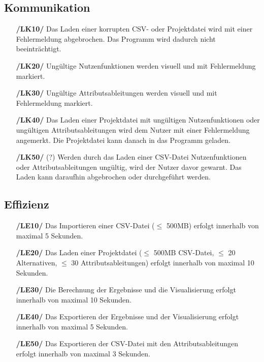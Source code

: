 \documentclass{article}
\begin{document}
\subsection{Kommunikation}
\begin{itemize}
    \item[\textbf{/LK10/}] Das Laden einer korrupten CSV- oder Projektdatei wird mit einer Fehlermeldung abgebrochen. Das Programm wird dadurch nicht beeinträchtigt.
    \item[\textbf{/LK20/}] Ungültige Nutzenfunktionen werden visuell und mit Fehlermeldung markiert.
    \item[\textbf{/LK30/}] Ungültige Attributsableitungen werden visuell und mit Fehlermeldung markiert.
    \item[\textbf{/LK40/}] Das Laden einer Projektdatei mit ungültigen Nutzenfunktionen oder ungültigen Attributsableitungen wird dem Nutzer mit einer Fehlermeldung angemerkt. Die Projektdatei kann danach in das Programm geladen.
    \item[\textbf{/LK50/}] (?) Werden durch das Laden einer CSV-Datei Nutzenfunktionen oder Attributsableitungen ungültig, wird der Nutzer davor gewarnt. Das Laden kann daraufhin abgebrochen oder durchgeführt werden.
\end{itemize}
\subsection{Effizienz}
\begin{itemize}
    \item[\textbf{/LE10/}] Das Importieren einer CSV-Datei ($\leq$ 500MB) erfolgt innerhalb von maximal 5 Sekunden.
    \item[\textbf{/LE20/}] Das Laden einer Projektdatei ($\leq$ 500MB CSV-Datei, $\leq$ 20 Alternativen, $\leq$ 30 Attributsableitungen) erfolgt innerhalb von maximal 10 Sekunden.
    \item[\textbf{/LE30/}] Die Berechnung der Ergebnisse und die Visualisierung erfolgt innerhalb von maximal 10 Sekunden.
    \item[\textbf{/LE40/}] Das Exportieren der Ergebnisse und der Visualisierung erfolgt innerhalb von maximal 5 Sekunden.
    \item[\textbf{/LE50/}] Das Exportieren der CSV-Datei mit den Attributsableitungen erfolgt innerhalb von maximal 3 Sekunden.
\end{itemize}

\clearpage
\end{document}
